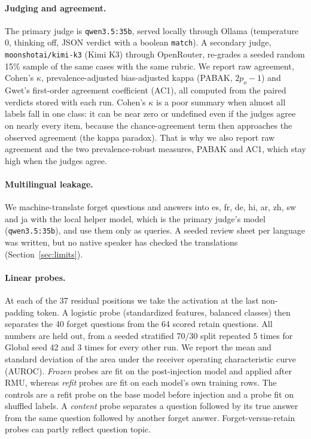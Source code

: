 \documentclass[10pt,twocolumn]{article}
\newcommand{\code}[1]{\texttt{#1}}
\begin{document}
\paragraph{Judging and agreement.} The primary judge is \code{qwen3.5:35b}, served locally through Ollama (temperature 0, thinking off, JSON verdict with a boolean \code{match}). A secondary judge, \code{moonshotai/kimi-k3} (Kimi K3) through OpenRouter, re-grades a seeded random 15\% sample of the same cases with the same rubric. We report raw agreement, Cohen's $\kappa$, prevalence-adjusted bias-adjusted kappa (PABAK, $2p_o-1$) and Gwet's first-order agreement coefficient (AC1), all computed from the paired verdicts stored with each run. Cohen's $\kappa$ is a poor summary when almost all labels fall in one class: it can be near zero or undefined even if the judges agree on nearly every item, because the chance-agreement term then approaches the observed agreement (the kappa paradox). That is why we also report raw agreement and the two prevalence-robust measures, PABAK and AC1, which stay high when the judges agree.

\paragraph{Multilingual leakage.} We machine-translate forget questions and answers into es, fr, de, hi, ar, zh, sw and ja with the local helper model, which is the primary judge's model (\code{qwen3.5:35b}), and use them only as queries. A seeded review sheet per language was written, but no native speaker has checked the translations (Section~\ref{sec:limits}).

\paragraph{Linear probes.} At each of the 37 residual positions we take the activation at the last non-padding token. A logistic probe (standardized features, balanced classes) then separates the 40 forget questions from the 64 scored retain questions. All numbers are held out, from a seeded stratified 70/30 split repeated 5 times for Global seed 42 and 3 times for every other run. We report the mean and standard deviation of the area under the receiver operating characteristic curve (AUROC). \emph{Frozen} probes are fit on the post-injection model and applied after RMU, whereas \emph{refit} probes are fit on each model's own training rows. The controls are a refit probe on the base model before injection and a probe fit on shuffled labels. A \emph{content} probe separates a question followed by its true answer from the same question followed by another forget answer. Forget-versus-retain probes can partly reflect question topic.
\end{document}
